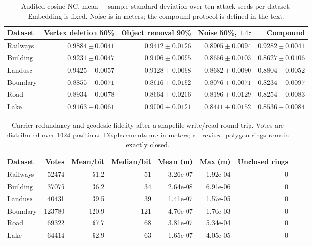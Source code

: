 \begin{table}[!t]
\centering\footnotesize
\caption{Audited cosine NC, mean $\pm$ sample standard deviation over ten attack seeds per dataset. Embedding is fixed. Noise is in meters; the compound protocol is defined in the text.}
\label{tab:revised_attacks}
\begin{tabular}{lrrrr}
\toprule
Dataset & Vertex deletion 50\% & Object removal 90\% & Noise 50\%, $1.4\tau$ & Compound \\
\midrule
Railways & $0.9884\pm0.0041$ & $0.9412\pm0.0126$ & $0.8905\pm0.0094$ & $0.9282\pm0.0041$ \\
Building & $0.9231\pm0.0047$ & $0.9106\pm0.0095$ & $0.8656\pm0.0103$ & $0.8627\pm0.0106$ \\
Landuse & $0.9425\pm0.0057$ & $0.9128\pm0.0098$ & $0.8682\pm0.0090$ & $0.8804\pm0.0052$ \\
Boundary & $0.8855\pm0.0071$ & $0.8616\pm0.0192$ & $0.8076\pm0.0071$ & $0.8234\pm0.0097$ \\
Road & $0.8934\pm0.0078$ & $0.8664\pm0.0206$ & $0.8196\pm0.0129$ & $0.8254\pm0.0083$ \\
Lake & $0.9163\pm0.0061$ & $0.9000\pm0.0121$ & $0.8441\pm0.0152$ & $0.8536\pm0.0084$ \\
\bottomrule
\end{tabular}
\end{table}
\begin{table}[!t]
\centering\footnotesize
\caption{Carrier redundancy and geodesic fidelity after a shapefile write/read round trip. Votes are distributed over 1024 positions. Displacements are in meters; all revised polygon rings remain exactly closed.}
\label{tab:revised_fidelity}
\begin{tabular}{lrrrrrr}
\toprule
Dataset & Votes & Mean/bit & Median/bit & Mean (m) & Max (m) & Unclosed rings \\
\midrule
Railways & 52474 & 51.2 & 51 & 3.26e-07 & 1.92e-04 & 0 \\
Building & 37076 & 36.2 & 34 & 2.64e-08 & 6.91e-06 & 0 \\
Landuse & 40431 & 39.5 & 39 & 1.41e-07 & 1.57e-05 & 0 \\
Boundary & 123780 & 120.9 & 121 & 4.70e-07 & 1.70e-03 & 0 \\
Road & 69322 & 67.7 & 68 & 3.81e-07 & 5.34e-04 & 0 \\
Lake & 64414 & 62.9 & 63 & 1.65e-07 & 4.05e-05 & 0 \\
\bottomrule
\end{tabular}
\end{table}
